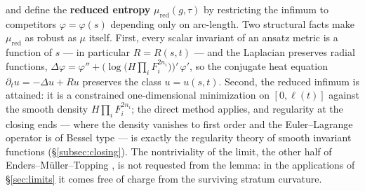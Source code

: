 \documentclass[11pt]{amsart}
\theoremstyle{plain}
\numberwithin{equation}{section}
\theoremstyle{definition}
\theoremstyle{remark}
\begin{document}
and define the \textbf{reduced entropy} $\mu_{\mathrm{red}} ( g, \tau )$ by restricting the infimum to competitors $\varphi = \varphi ( s )$ depending only on arc-length. Two structural facts make $\mu_{\mathrm{red}}$ as robust as $\mu$ itself. First, every scalar invariant of an ansatz metric is a function of $s$ --- in particular $R = R ( s, t )$ --- and the Laplacian preserves radial functions, $\Delta \varphi = \varphi'' + \big( \log \big( H \prod_i F_i^{2 n_i} \big) \big)'\, \varphi'$, so the conjugate heat equation $\partial_t u = - \Delta u + R u$ preserves the class $u = u ( s, t )$. Second, the reduced infimum is attained: it is a constrained one-dimensional minimization on $[ 0, \ell ( t ) ]$ against the smooth density $H \prod_i F_i^{2 n_i}$; the direct method applies, and regularity at the closing ends --- where the density vanishes to first order and the Euler--Lagrange operator is of Bessel type --- is exactly the regularity theory of smooth invariant functions (\S\ref{subsec:closing}). The nontriviality of the limit, the other half of Enders--Müller--Topping \cite{EMT}, is not requested from the lemma: in the applications of \S\ref{sec:limits} it comes free of charge from the surviving stratum curvature.
\end{document}
